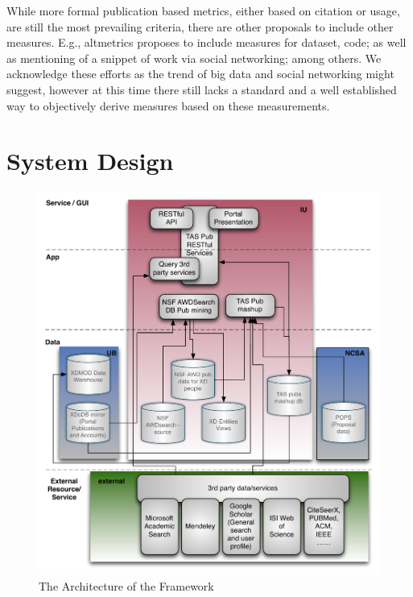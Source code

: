 \documentclass{sig-alternate}
\begin{document}
While more formal publication based metrics, either based on citation or usage, are still the most prevailing criteria, there are other proposals to include other measures. E.g., altmetrics \cite{www-altmetrics} proposes to include measures for dataset, code; as well as mentioning of a snippet of work via social networking; among others. We acknowledge these efforts as the trend of big data and social networking might suggest, however at this time there still lacks a standard and a well established way to objectively derive measures based on these measurements. 
 
 
% 
 
% 
 
\section{System Design} \label{S:design}
 
\begin{figure}[!htb] 
  \centering 
    \includegraphics[width=1.0\columnwidth]{images/tas-arch.pdf} 
  \caption{The Architecture of the Framework}\label{F:tas-arch} 
\end{figure} 
  
\end{document}
